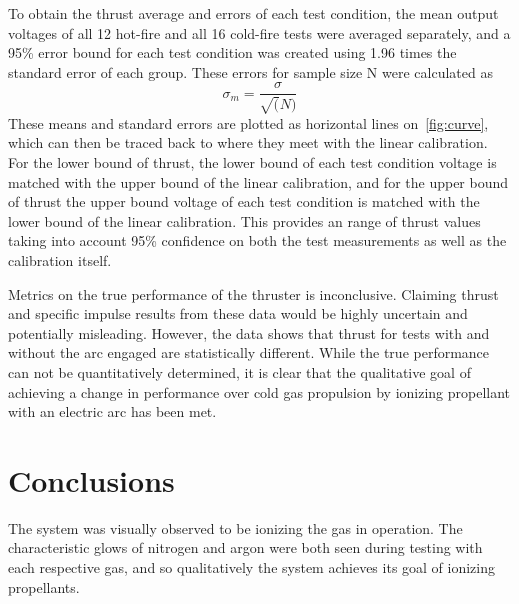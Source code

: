 \documentclass[conference]{IEEEtran}
\begin{document}
To obtain the thrust average and errors of each test condition, the mean output voltages of all 12 hot-fire and all 16 cold-fire tests were averaged separately, and a 95\% error bound for each test condition was created using 1.96 times the standard error of each group.
These errors for sample size N were calculated as
\begin{equation}
\label{eq:stderr}
  \sigma_m = \frac{\sigma}{\sqrt(N)}
\end{equation}
These means and standard errors are plotted as horizontal lines on~\autoref{fig:curve}, which can then be traced back to where they meet with the linear calibration.
For the lower bound of thrust, the lower bound of each test condition voltage is matched with the upper bound of the linear calibration, and for the upper bound of thrust the upper bound voltage of each test condition is matched with the lower bound of the linear calibration.
This provides an range of thrust values taking into account 95\% confidence on both the test measurements as well as the calibration itself.

Metrics on the true performance of the thruster is inconclusive.
Claiming thrust and specific impulse results from these data would be highly uncertain and potentially misleading.
However, the data shows that thrust for tests with and without the arc engaged are statistically different.
While the true performance can not be quantitatively determined, it is clear that the qualitative goal of achieving a change in performance over cold gas propulsion by ionizing propellant with an electric arc has been met.



\section{Conclusions}
The system was visually observed to be ionizing the gas in operation. The characteristic glows of nitrogen and argon were both seen during testing with each respective gas, and so qualitatively the system achieves its goal of ionizing propellants.
\end{document}
